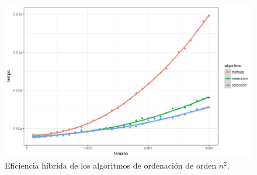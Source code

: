 \documentclass[a4paper, 11pt]{article}
\begin{document}
\begin{figure}[!hbp]
	\includegraphics[width=\textwidth]{hibridaor2.png}
	\caption{Eficiencia híbrida de los algoritmos de ordenación de orden $n^2$.\label{hibridaor2}}
\end{figure}
\end{document}
